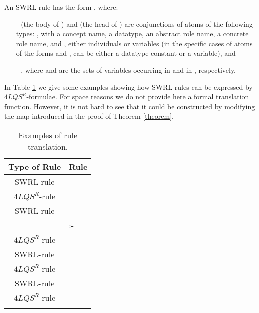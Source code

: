 \documentclass[a4paper]{llncs}
\newcommand{\flqsr}{\ensuremath{4LQS^R}}
\begin{document}
An SWRL-rule  has the form , where:
 \begin{itemize}
 \item[-]   (the body of ) and  (the head of ) are conjunctions of atoms of the following types: ,
with  a concept name,  a datatype,  an abstract role name,  a concrete role name, and ,  either individuals or variables (in the specific cases of atoms of the forms  and ,  can be either a datatype constant or a variable), and

\newcommand{\Var}{\textit{Var}}
\item[-]
, where  and  are the sets of variables occurring in  and in , respectively.
 \end{itemize}

 In Table \ref{SWRL} we give some examples showing how SWRL-rules can be expressed by \flqsr-formulae. For space reasons we do not provide here a formal translation function. However, it is not hard to see that
it could be constructed by modifying the map  introduced in the proof of Theorem \ref{theorem}.
\newcommand{\hasParent}{\textit{hasParent}}
\newcommand{\hasBrother}{\textit{hasBrother}}
\newcommand{\hasUncle}{\textit{hasUncle}}
\newcommand{\Location}{\textit{Location}}
\newcommand{\Trauma}{\textit{Trauma}}
\newcommand{\isLocationOf}{\textit{isLocationOf}}
\newcommand{\isPartOf}{\textit{isPartOf}}
\newcommand{\Person}{\textit{Person}}
\newcommand{\hasAge}{\textit{hasAge}}
\newcommand{\Adult}{\textit{Adult}}
\newcommand{\hasLocation}{\textit{hasLocation}}
\newcommand{\hasRegion}{\textit{hasRegion}}
\newcommand{\Region}{\textit{Region}}
{\small
\begin{longtable}{|c|>{\centering\arraybackslash}m{10cm}|}
\hline
Type of Rule & Rule\\
\hline
SWRL-rule &   \\
\flqsr-rule & \\
\hline
SWRL-rule &   \\
       & :-  \\
\flqsr-rule & \\
\hline
SWRL-rule &   \\
\flqsr-rule & \\
\hline
SWRL-rule &   \\
\flqsr-rule & \\
\hline
\caption{ Examples of rule translation.}\label{SWRL}
\end{longtable}}
\end{document}
